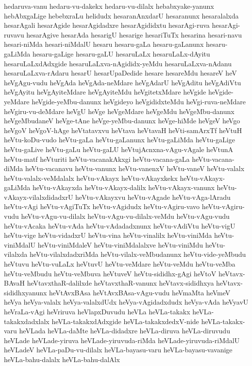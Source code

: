 {hedaruva-vanu
hedaru-vu-dakekx
hedaru-vu-dilalx
hebabxyake-yanunx
hebAbxgaLige
hebebxraLu
helidudx
hesaranAnxdarU
hesaranunx
hesaralalxda
hesarAgali
hesarAgide
hesarAgidadxre
hesarAgididxtu
hesarAgi-ruva
hesarAgi-ruvavu
hesarAgive
hesarAda
hesarigU
hesarige
hesariTuTx
hesarina
hesari-navu
hesari-niMda
hesari-niMdalU
hesaru
hesaru-gaLa
hesaru-gaLanunx
hesaru-gaLiMda
hesaru-gaLige
hesaru-gaLU
hesaruLaLx
hesaruLaLx-dAyitu
hesaruLaLxdAdxgide
hesaruLaLxva-nAgididx-yeMdu
hesaruLaLxva-nAdanu
hesaruLaLxva-rAdaru
hesarU
hesarUpaDedide
hesare
hesareMdu
hesareV
heV
heVgAgu-vudu
heVgAda
heVgAda-neMdare
heVgAdarU
heVgAditu
heVgAdiVtu
heVgAyitu
heVgAyiteMdare
heVgAyiteMdu
heVgitetxMdare
heVgide
heVgide-yeMdare
heVgide-yeMbu-danunx
heVgideyo
heVgididxteMdu
heVgi-ruva-neMdare
heVgiru-vu-deMdare
heVgU
heVge
heVgeMdare
heVgeMdu
heVgeMbu-danunx
heVgeMbudaneV
heVge-tAne
heVge-yeMbu-danunx
heVge-hiMde
heVgeV
heVgo
heVgoV
heVgoV-hAge
heVtatavxvu
heVtava
heVtavaH
heVti-samArxTf
heVtuH
heVtu-koDu-vudo
heVtu-gaLa
heVtu-gaLanunx
heVtu-gaLiMda
heVtu-gaLige
heVtu-gaLive
heVtu-gaLu
heVtu-gaLU
heVtujAcnxna-vAgu-vAgale
heVtunA
heVtu-matf
heVturiti
heVtu-vacanakAkxgi
heVtu-vacana-gaLa
heVtu-vacana-diMda
heVtu-vacanavu
heVtu-vanunx
heVtu-vanenxV
heVtu-vaneV
heVtu-valalx
heVtu-valalx-veMdalalx
heVtu-vAkayx
heVtu-vAkayxkekx
heVtu-vAkayx-gaLiMda
heVtu-vAkayxda
heVtu-vAkayx-dalilx
heVtu-vAkayx-vanunx
heVtu-vAkayx-vilalxdidadxrU
heVtu-vAkayxvu
heVtu-vAgade
heVtu-vAga-lAradu
heVtu-vAgi
heVtu-vAgiTuTx
heVtu-vAgidudx
heVtu-vAgiru-vavo
heVtu-vAgiru-vudu
heVtu-vAgu-vu-dilalx
heVtu-vAgu-vu-dilalx-veMdu
heVtu-vAgu-vudu
heVtu-vAcaka
heVtu-vAda
heVtu-vAdadadxnunx
heVtu-vAdiVtu
heVtu-vigU
heVtu-vige
heVtu-vidadxrU
heVtu-vina
heVtu-vinalilx
heVtu-viniMda
heVtu-viniMdalU
heVtu-viniMdaleV
heVtu-viniMdalalxve
heVtu-viniMdu
heVtu-vilalxda
heVtu-vilalxdadxriMda
heVtu-vilalx-veMbudanunx
heVtu-vide-yeMbudu
heVtuvu
heVtu-vuLaLx
heVtuvU
heVtu-veMdare
heVtu-veMdu
heVtu-veMba
heVtu-veMbudu
heVtu-veMbuva
heVtuveV
heVtu-sididhx-gAgi
heVtoV
heVtavx-BAvaH
heVtavxthaR-dalilxde
heVtavxthaR-vanunx
heVtavx-sididhxya
heVtavx-sididhxyanunx
heVtAvxBAsa
heVtAvxBAsa-vAgu-vudu
heVmaMta
heVmeV
heVya
heVya-valalx
heVya-valalxdUdx
heVya-vAgidadxdudx
heVya-vAda
heVyavU
heVraLa-vAgi
heVriruva
heVlapxDuvudu
heVLa
heVLa-takakx
heVLa-takakxdadxlalx
heVLa-takakxdAdxgide
heVLa-takakxdedxV-nide
heVLa-takakx-varu
heVLada
heVLa-daMte
heVLa-didadxre
heVLa-diruva
heVLa-diruvudu
heVLade
heVLade-yiruva
heVLade-yiruvuda-riMda
heVLade-yiruvuda-riMdalU
heVLadeV
heVLa-paDu-vu-dilalx
heVLa-bayasu-varu
heVLa-bayasu-vavanige
heVLa-bahu-dalalx
heVLa-bahu-dalAlx
}
